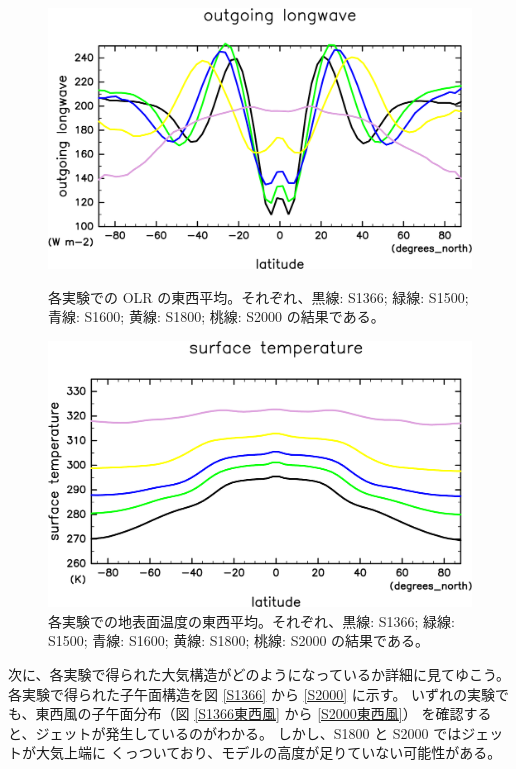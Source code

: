 \documentclass[body]{subfiles}
\begin{document}
\begin{figure}[t]
	\centering
	\begin{minipage}{.45\textwidth}
		\centering
		\includegraphics[width=\textwidth]{OLR-overplot-crop-rotate.pdf}
		\caption[各実験での OLR の東西平均]{
			各実験での OLR の東西平均。それぞれ、黒線: S1366;
			緑線: S1500; 青線: S1600; 黄線: S1800; 桃線: S2000 の結果である。
		}\label{OLR東西平均}
	\end{minipage}
	\hfill
	\begin{minipage}{.45\textwidth}
		\centering
		\includegraphics[width=\textwidth]{SurfTemp-overplot-crop-rotate.pdf}
		\caption[各実験での地表面温度の東西平均]{
			各実験での地表面温度の東西平均。それぞれ、黒線: S1366;
			緑線: S1500; 青線: S1600; 黄線: S1800; 桃線: S2000 の結果である。
		}\label{地表面温度}
	\end{minipage}
\end{figure}

次に、各実験で得られた大気構造がどのようになっているか詳細に見てゆこう。
各実験で得られた子午面構造を図 \ref{S1366} から \ref{S2000} に示す。
いずれの実験でも、東西風の子午面分布（図 \ref{S1366東西風} から \ref{S2000東西風}）
を確認すると、ジェットが発生しているのがわかる。
しかし、S1800 と S2000 ではジェットが大気上端に
くっついており、モデルの高度が足りていない可能性がある。
\end{document}

